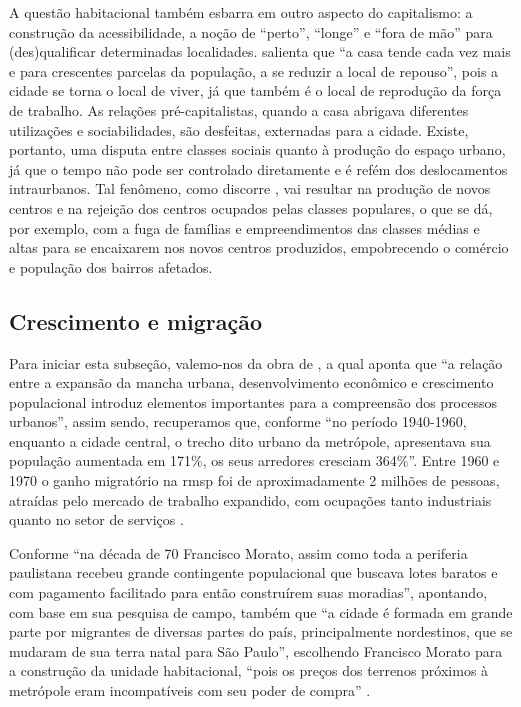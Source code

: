 	A questão habitacional também esbarra em outro aspecto do capitalismo: a construção da acessibilidade, a noção de ``perto'', ``longe'' e ``fora de mão'' para (des)qualificar determinadas localidades.  salienta que ``a casa tende cada vez mais e para crescentes parcelas da população, a se reduzir a local de repouso'', pois a cidade se torna o local de viver, já que também é o local de reprodução da força de trabalho. As relações pré-capitalistas, quando a casa abrigava diferentes utilizações e sociabilidades, são desfeitas, externadas para a cidade. Existe, portanto, uma disputa entre classes sociais quanto à produção do espaço urbano, já que o tempo não pode ser controlado diretamente e é refém dos deslocamentos intraurbanos. Tal fenômeno, como discorre , vai resultar na produção de novos centros e na rejeição dos centros ocupados pelas classes populares, o que se dá, por exemplo, com a fuga de famílias e empreendimentos das classes médias e altas para se encaixarem nos novos centros produzidos, empobrecendo o comércio e população dos bairros afetados.
	
	\subsection{Crescimento e migração}
	
	Para iniciar esta subseção, valemo-nos da obra de , a qual aponta que ``a relação entre a expansão da mancha urbana, desenvolvimento econômico e crescimento populacional introduz elementos importantes para a compreensão dos processos urbanos'', assim sendo, recuperamos que, conforme  ``no período 1940-1960, enquanto a cidade central, o trecho dito urbano da metrópole, apresentava sua população aumentada em 171\%, os seus arredores cresciam 364\%''. Entre 1960 e 1970 o ganho migratório na \glsdesc{rmsp} foi de aproximadamente 2 milhões de pessoas, atraídas pelo mercado de trabalho expandido, com ocupações tanto industriais quanto no setor de serviços \cite[p.42]{meyer2004}.
	
	Conforme  ``na década de 70 Francisco Morato, assim como toda a periferia paulistana recebeu grande contingente populacional que buscava lotes baratos e com pagamento facilitado para então construírem suas moradias'', apontando, com base em sua pesquisa de campo, também que ``a cidade é formada em grande parte por migrantes de diversas partes do país, principalmente nordestinos, que se mudaram de sua terra natal para São Paulo'', escolhendo Francisco Morato para a  construção da unidade habitacional, ``pois os preços dos terrenos próximos à metrópole eram incompatíveis com seu poder de compra'' .

